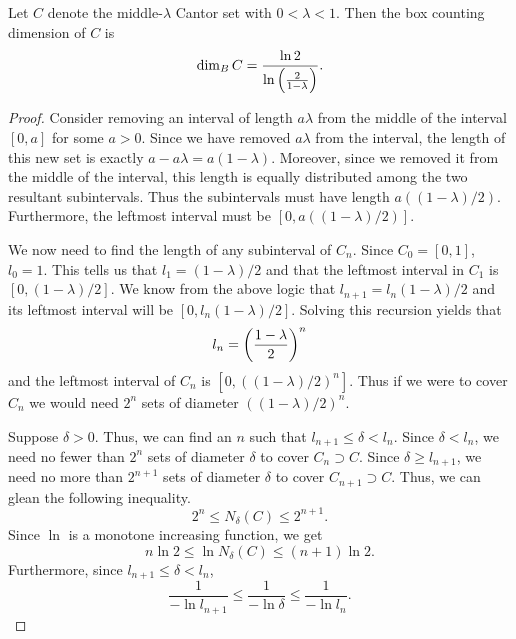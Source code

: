\documentclass[notitlepage]{simple}
\def\dim{\operatorname{dim}}
\begin{document}
	\begin{thm}
		Let $C$ denote the middle-$\lambda$ Cantor set with $0 < \lambda < 1$.
		Then the box counting dimension of $C$ is
		\[
			\dim_B C = \frac{\ln 2}{\ln\paren{\frac{2}{1-\lambda}}}.
		\]
	\end{thm}
	\begin{proof}
		Consider removing an interval of length $a\lambda$ from the middle of the interval $[0,a]$ for some $a>0$.
		Since we have removed $a\lambda$ from the interval, the length of this new set is exactly $a-a\lambda=a(1-\lambda)$.
		Moreover, since we removed it from the middle of the interval, this length is equally distributed among the two resultant subintervals.
		Thus the subintervals must have length $a((1-\lambda)/2)$.
		Furthermore, the leftmost interval must be $[0,a((1-\lambda)/2)]$.

		We now need to find the length of any subinterval of $C_n$.
		Since $C_0=[0,1]$, $l_0=1$.
		This tells us that $l_1=(1-\lambda)/2$ and that the leftmost interval in $C_1$ is $[0,(1-\lambda)/2]$.
		We know from the above logic that $l_{n+1}=l_n(1-\lambda)/2$ and its leftmost interval will be $[0,l_n(1-\lambda)/2]$.
		Solving this recursion yields that
		\[
			l_n = \left( \frac{1-\lambda}{2} \right)^n
		\]
		and the leftmost interval of $C_n$ is $[0,((1-\lambda)/2)^n]$.
		Thus if we were to cover $C_n$ we would need $2^n$ sets of diameter $((1-\lambda)/2)^n$.

		Suppose $\delta >0$.
		Thus, we can find an $n$ such that $l_{n+1}\leq \delta < l_n$.
		Since $\delta < l_n$, we need no fewer than $2^n$ sets of diameter $\delta$ to cover $C_n\supset C$.
		Since $\delta \geq l_{n+1}$, we need no more than $2^{n+1}$ sets of diameter $\delta$ to cover $C_{n+1}\supset C$.
		Thus, we can glean the following inequality.
		\[
			2^{n} \leq N_\delta(C) \leq 2^{n+1}.
		\]
		Since $\ln$ is a monotone increasing function, we get
		\begin{equation}\label{ln-num}
			n\ln 2 \leq \ln N_\delta(C) \leq (n+1)\ln 2.
		\end{equation}
		Furthermore, since $l_{n+1}\leq \delta < l_n$,
		\begin{equation}\label{ln-den}
			\frac{1}{-\ln l_{n+1}} \leq \frac{1}{-\ln\delta} \leq \frac{1}{-\ln l_n}.
		\end{equation}


\end{proof}
\end{document}
